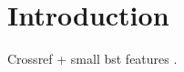 \documentclass[acmsmall,nonacm]{acmart}
\begin{document}
\thispagestyle{empty}%

\section{Introduction}
Crossref + small bst features \cite{xchild1,xchild2,xsolo,prockey,durl}.



\end{document}
